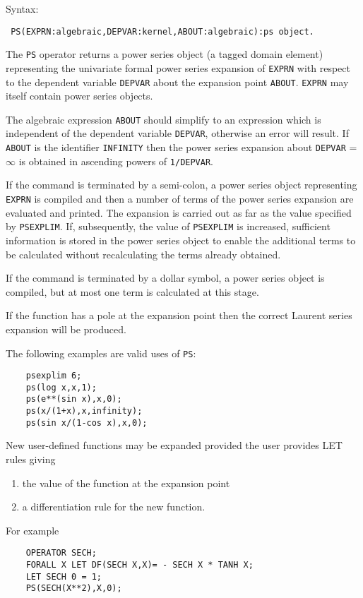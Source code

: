 Syntax:
\begin{verbatim}
 PS(EXPRN:algebraic,DEPVAR:kernel,ABOUT:algebraic):ps object.
\end{verbatim}
The {\tt PS} operator returns a  power series object (a tagged domain element)
representing the univariate formal power series expansion of {\tt EXPRN} with
respect to the dependent variable {\tt DEPVAR} about the expansion point
{\tt ABOUT}.  {\tt EXPRN} may itself contain power series objects.
 
The algebraic expression {\tt ABOUT} should simplify to an expression
which is independent of the dependent variable {\tt DEPVAR}, otherwise
an error will result.  If {\tt ABOUT} is the identifier {\tt INFINITY}
then the power series expansion about {\tt DEPVAR} = $\infty$ is
obtained in ascending powers of {\tt 1/DEPVAR}.
 
If the command is terminated by a semi-colon, a power series object
representing {\tt EXPRN} is compiled and then a number of terms of the
power series expansion are evaluated and printed.  The expansion is
carried out as far as the value specified by {\tt PSEXPLIM}.  If,
subsequently, the value of {\tt PSEXPLIM} is increased, sufficient
information is stored in the power series object to enable the
additional terms to be calculated without recalculating the terms
already obtained.
 
If the command is terminated by a dollar symbol, a power series object
is compiled, but at most one term is calculated at this stage.
 
If the function has a pole at the expansion point then the correct
Laurent series expansion will be produced.
 
\noindent The following examples are valid uses of {\tt PS}:
\begin{verbatim}
    psexplim 6;
    ps(log x,x,1);
    ps(e**(sin x),x,0);
    ps(x/(1+x),x,infinity);
    ps(sin x/(1-cos x),x,0);
\end{verbatim}

New user-defined functions may be expanded provided the user provides
LET rules giving
\begin{enumerate}
\item the value of the function at the expansion point
\item a differentiation rule for the new function.
\end{enumerate}

\noindent For example
\begin{verbatim}
    OPERATOR SECH;
    FORALL X LET DF(SECH X,X)= - SECH X * TANH X;
    LET SECH 0 = 1;
    PS(SECH(X**2),X,0);
\end{verbatim}
 
